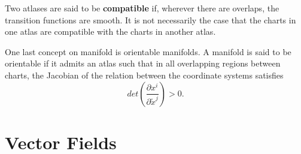 \documentclass[a4paper,11pt]{article}
\theoremstyle{remark}
\begin{document}
Two atlases are said to be \textbf{compatible} if, wherever there are
overlaps, the transition functions are smooth. It is not necessarily
the case that the charts in one atlas are compatible with the charts
in another atlas.\par
One last concept on manifold is orientable manifolds. A manifold is
said to be orientable if it admits an atlas such that in all
overlapping regions between charts, the Jacobian of the relation
between the coordinate systems satisfies$$det\left( \frac{\partial
    x^i}{\partial\tilde{x}^j} \right)>0.$$ 
\section{Vector Fields}
\label{s:vefi}





\end{document}
